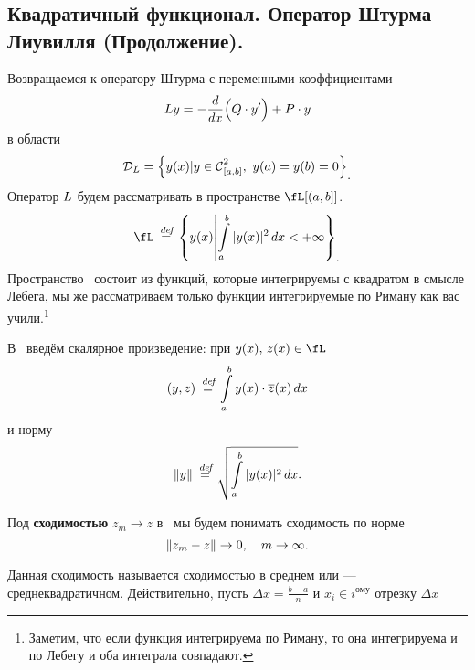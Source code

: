 	\chapter{}
\label{lecture5}
\section[Квадратичный функционал. Оператор Штурма (Продолжение). ]{Квадратичный функционал. Оператор Штурма--Лиувилля (Продолжение).}
\label{lecture5section1}
Возвращаемся к оператору Штурма с переменными коэффициентами
\begin{equation}
	\label{l5:eq:1}
	\hfill \LL{}y=-\der{}{x}\Big(Q\cdot y'\Big)+P\cdot y\hfill
\end{equation}
в области 
\begin{equation*}
	\hfill\mc{D}_{\LL}=\left\{y(x)|y\in\Cfn[{[a,b]}]{2},\ y(a)=y(b)=0\right\}_{\displaystyle.}\hfill
\end{equation*}
Оператор $L$ будем рассматривать в пространстве $\fL[{(a,b]}]$.
\begin{equation*}
	\hfill \fL\eqdef\left\{y(x)\middle|\int\limits_a^b|y(x)|^2\,dx<+\infty\right\}_{\displaystyle.}\hfill
\end{equation*}
Пространство \fL\ состоит из функций, которые интегрируемы с квадратом в смысле Лебега, мы же рассматриваем только функции интегрируемые по Риману как вас учили.\footnote[1]{Заметим, что если функция интегрируема по Риману, то она интегрируема и по Лебегу и оба интеграла совпадают.}

В \fL\ введём скалярное произведение: при $y(x),\,z(x)\in\fL$
\begin{equation*}
	\hfill(y,z)\eqdef\int\limits_a^b y(x)\cdot \overline{z}(x)\,dx\hfill
\end{equation*}  
и норму
\begin{equation*}
	\hfill\norm{y}\eqdef\sqrt{\int\limits_a^b|y(x)|^2\,dx}.\hfill
\end{equation*}
\begin{_def}
	Под \textbf{сходимостью} $z_{m}\to z$ в \fL\ мы будем понимать сходимость по норме
	\begin{equation*}
		\hfill\norm{z_m-z}\to0,\quad m\to\infty.\hfill
	\end{equation*}
\end{_def}

Данная сходимость называется сходимостью в среднем или --- среднеквадратичном. Действительно, пусть $\Delta x=\frac{b-a}{n}$ и $x_i\in i^{\text{ому}}$ отрезку $\Delta x$
\vspace{0,2cm}

